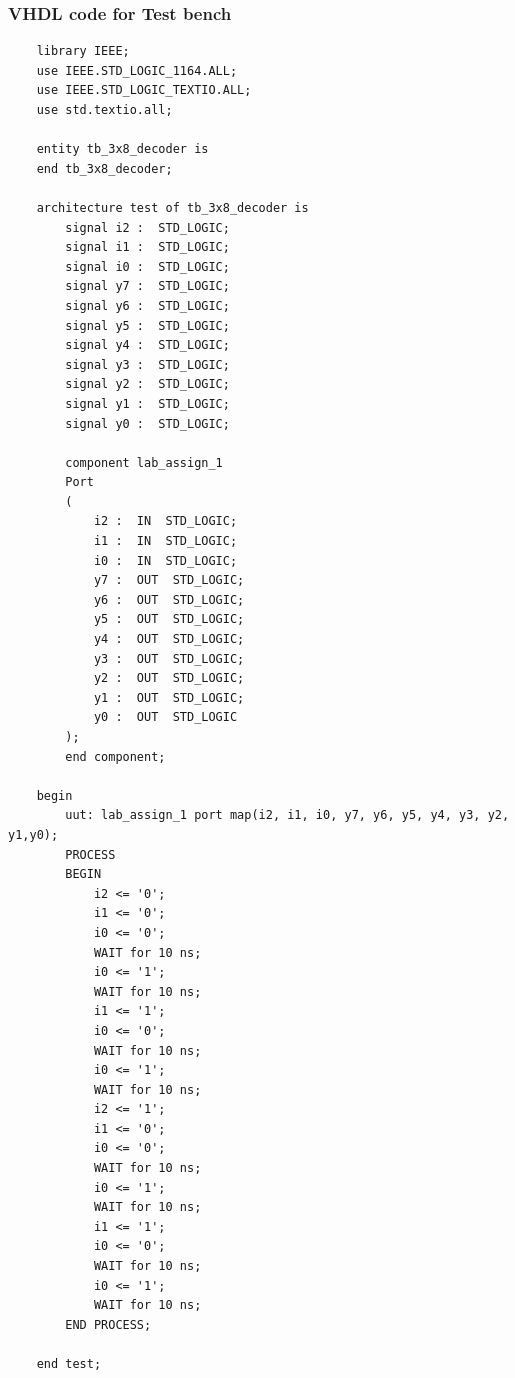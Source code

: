 \documentclass[12pt]{article}
\begin{document}
\subsubsection{VHDL code for Test bench}
\begin{verbatim}
    library IEEE;
    use IEEE.STD_LOGIC_1164.ALL;
    use IEEE.STD_LOGIC_TEXTIO.ALL;
    use std.textio.all;
    
    entity tb_3x8_decoder is
    end tb_3x8_decoder;
    
    architecture test of tb_3x8_decoder is
        signal i2 :  STD_LOGIC;
        signal i1 :  STD_LOGIC;
        signal i0 :  STD_LOGIC;
        signal y7 :  STD_LOGIC;
        signal y6 :  STD_LOGIC;
        signal y5 :  STD_LOGIC;
        signal y4 :  STD_LOGIC;
        signal y3 :  STD_LOGIC;
        signal y2 :  STD_LOGIC;
        signal y1 :  STD_LOGIC;
        signal y0 :  STD_LOGIC;
    
        component lab_assign_1
    	Port
    	(
    		i2 :  IN  STD_LOGIC;
    		i1 :  IN  STD_LOGIC;
    		i0 :  IN  STD_LOGIC;
    		y7 :  OUT  STD_LOGIC;
    		y6 :  OUT  STD_LOGIC;
    		y5 :  OUT  STD_LOGIC;
    		y4 :  OUT  STD_LOGIC;
    		y3 :  OUT  STD_LOGIC;
    		y2 :  OUT  STD_LOGIC;
    		y1 :  OUT  STD_LOGIC;
    		y0 :  OUT  STD_LOGIC
    	);
        end component;
    
    begin
        uut: lab_assign_1 port map(i2, i1, i0, y7, y6, y5, y4, y3, y2, y1,y0);
        PROCESS
        BEGIN
            i2 <= '0';
            i1 <= '0';
            i0 <= '0';
            WAIT for 10 ns;
            i0 <= '1';
            WAIT for 10 ns;
            i1 <= '1';
            i0 <= '0';
            WAIT for 10 ns;
            i0 <= '1';
            WAIT for 10 ns;
            i2 <= '1';
            i1 <= '0';
            i0 <= '0';
            WAIT for 10 ns;
            i0 <= '1';
            WAIT for 10 ns;
            i1 <= '1';
            i0 <= '0';
            WAIT for 10 ns;
            i0 <= '1';
            WAIT for 10 ns;
        END PROCESS;
    
    end test;
\end{verbatim}
\end{document}
